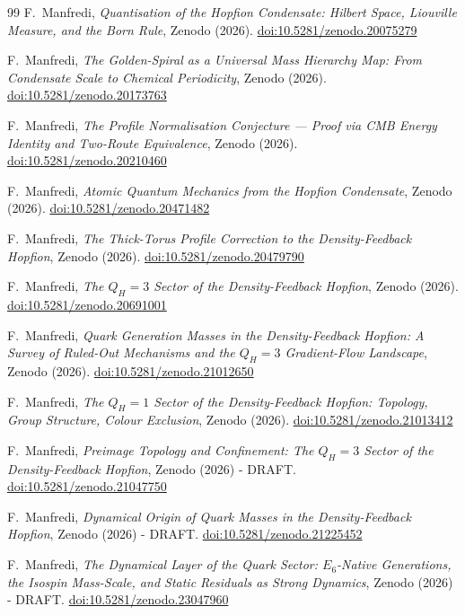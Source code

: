 \documentclass[11pt,a4paper]{article}
\begin{document}
\begin{thebibliography}{99}
F.~Manfredi,
\textit{Quantisation of the Hopfion Condensate: Hilbert Space,
  Liouville Measure, and the Born Rule},
Zenodo (2026).
\href{https://doi.org/10.5281/zenodo.20075279}{doi:10.5281/zenodo.20075279}

F.~Manfredi,
\textit{The Golden-Spiral as a Universal Mass Hierarchy Map:
  From Condensate Scale to Chemical Periodicity},
Zenodo (2026).
\href{https://doi.org/10.5281/zenodo.20173763}{doi:10.5281/zenodo.20173763}

F.~Manfredi,
\textit{The Profile Normalisation Conjecture ---
  Proof via CMB Energy Identity and Two-Route Equivalence},
Zenodo (2026).
\href{https://doi.org/10.5281/zenodo.20210460}{doi:10.5281/zenodo.20210460}

F.~Manfredi,
\textit{Atomic Quantum Mechanics from the Hopfion Condensate},
Zenodo (2026).
\href{https://doi.org/10.5281/zenodo.20471482}{doi:10.5281/zenodo.20471482}

F.~Manfredi,
\textit{The Thick-Torus Profile Correction to the Density-Feedback Hopfion},
Zenodo (2026).
\href{https://doi.org/10.5281/zenodo.20479790}{doi:10.5281/zenodo.20479790}

F.~Manfredi,
\textit{The $Q_H=3$ Sector of the Density-Feedback Hopfion},
Zenodo (2026).
\href{https://doi.org/10.5281/zenodo.20691001}{doi:10.5281/zenodo.20691001}

F.~Manfredi,
\textit{Quark Generation Masses in the Density-Feedback Hopfion:
A Survey of Ruled-Out Mechanisms and the $Q_H=3$ Gradient-Flow Landscape},
Zenodo (2026).
\href{https://doi.org/10.5281/zenodo.21012650}{doi:10.5281/zenodo.21012650}

F.~Manfredi,
\textit{The $Q_H=1$ Sector of the Density-Feedback Hopfion:
Topology, Group Structure, Colour Exclusion},
Zenodo (2026).
\href{https://doi.org/10.5281/zenodo.21013412}{doi:10.5281/zenodo.21013412}

F.~Manfredi,
\textit{Preimage Topology and Confinement: The $Q_H=3$ Sector of the Density-Feedback Hopfion},
Zenodo (2026) - DRAFT.
\href{https://doi.org/10.5281/zenodo.21047750}{doi:10.5281/zenodo.21047750}

F.~Manfredi,
\textit{Dynamical Origin of Quark Masses in the Density-Feedback Hopfion},
Zenodo (2026) - DRAFT.
\href{https://doi.org/10.5281/zenodo.21225452}{doi:10.5281/zenodo.21225452}

F.~Manfredi,
\textit{The Dynamical Layer of the Quark Sector: $E_6$-Native
Generations, the Isospin Mass-Scale, and Static Residuals as Strong
Dynamics},
Zenodo (2026) - DRAFT.
\href{https://doi.org/10.5281/zenodo.23047960}{doi:10.5281/zenodo.23047960}


\end{thebibliography}
\end{document}
